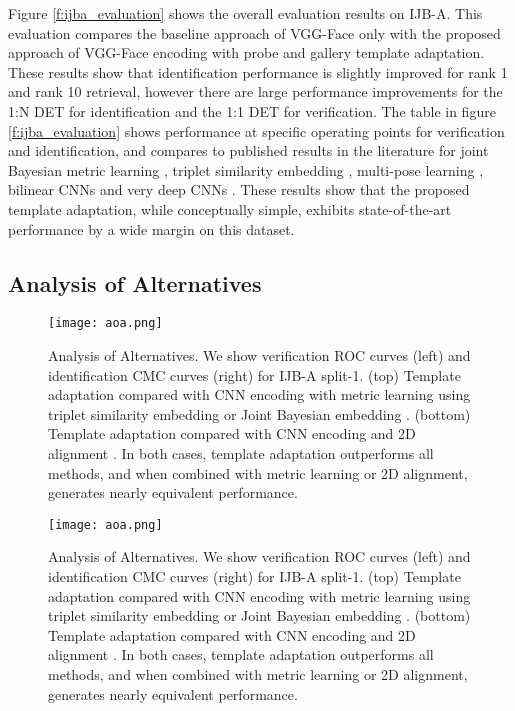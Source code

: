 \documentclass[10pt,twocolumn,letterpaper]{article}
\theoremstyle{definition}		\newtheorem{defn}[thm]{Definition}
\newcommand{\figwidth}{6.85in}
\newcommand{\ARXIV}{}
\begin{document}
Figure \ref{f:ijba_evaluation} shows the overall evaluation results on IJB-A.  This evaluation compares the baseline approach of VGG-Face only \cite{Parkhi15} with the proposed approach of VGG-Face encoding with probe and gallery template adaptation.  These results show that identification performance is slightly improved for rank 1 and rank 10 retrieval, however there are large performance improvements for the 1:N DET for identification and the 1:1 DET for verification.  The table in figure \ref{f:ijba_evaluation} shows performance at specific operating points for verification and identification, and compares to published results in the literature for joint Bayesian metric learning \cite{Chen16}, triplet similarity embedding \cite{Sankaranarayanan16}, multi-pose learning \cite{AbdAlmageed16}, bilinear CNNs \cite{RoyChowdry16} and very deep CNNs \cite{Parkhi15,Wang15}.  These results show that the proposed template adaptation, while conceptually simple, exhibits state-of-the-art performance by a wide margin on this dataset.


\subsection{Analysis of Alternatives}
\label{ss:aoa}

\ifdefined\ECCV
\begin{figure*}[!t]
\begin{centering}
\texttt{[image: aoa.png]} 
\caption{Analysis of Alternatives. We show verification ROC curves (left) and identification CMC curves (right) for IJB-A split-1.  (top) Template adaptation compared with CNN encoding with metric learning using triplet similarity embedding \cite{Parkhi15,Schroff15} or Joint Bayesian embedding \cite{Chen12,Chen15}. (bottom) Template adaptation compared with CNN encoding and 2D alignment \cite{Taigman14,Parkhi15}.  In both cases, template adaptation outperforms all methods, and when combined with metric learning or 2D alignment, generates nearly equivalent performance.  }
\label{f:aoa}
\end{centering}
\end{figure*}
 \fi
\ifdefined\ARXIV
\begin{figure*}[!t]
\begin{centering}
\texttt{[image: aoa.png]} 
\caption{Analysis of Alternatives. We show verification ROC curves (left) and identification CMC curves (right) for IJB-A split-1.  (top) Template adaptation compared with CNN encoding with metric learning using triplet similarity embedding \cite{Parkhi15,Schroff15} or Joint Bayesian embedding \cite{Chen12,Chen15}. (bottom) Template adaptation compared with CNN encoding and 2D alignment \cite{Taigman14,Parkhi15}.  In both cases, template adaptation outperforms all methods, and when combined with metric learning or 2D alignment, generates nearly equivalent performance.  }
\label{f:aoa}
\end{centering}
\end{figure*}
 \fi
\end{document}

